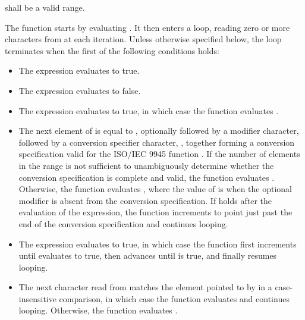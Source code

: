 \begin{itemdescr}
\pnum
\requires {} shall be a valid range.

\pnum
\effects The function starts by evaluating
. It then enters a loop, reading zero or more
characters from  at each iteration. Unless otherwise specified below,
the loop terminates when the first of the following conditions holds:

\begin{itemize}
\item The expression  evaluates to true.

\item The expression  evaluates to false.

\item The expression  evaluates to true,
in which case the function
evaluates .

\item The next element of  is equal to
, optionally followed by a
modifier character, followed by a conversion specifier character,
, together forming a conversion specification valid for the
ISO/IEC 9945 function . If the number of elements in the range
 is not sufficient to unambiguously determine whether the
conversion specification is complete and valid, the function evaluates
. Otherwise, the function evaluates
, where the value
of  is 
when the optional modifier is absent from the conversion specification.
If  holds after the evaluation of the
expression, the function increments  to point just past the end of
the conversion specification and continues looping.

\item The expression  evaluates to true,
in which case
the function first increments  until
 evaluates to true,
then advances  until
 is true, and finally resumes looping.

\item The next character read from  matches the element
pointed to by  in
a case-insensitive comparison, in which case the function evaluates
 and continues looping. Otherwise, the function evaluates
.
\end{itemize}


\end{itemdescr}
